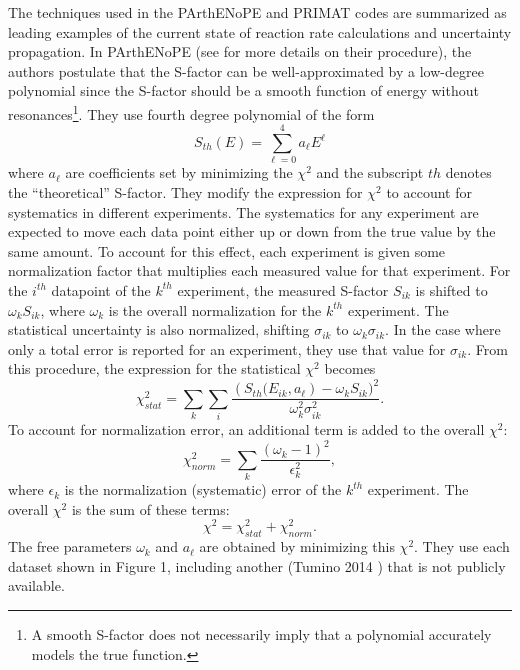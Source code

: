 \documentclass[%
 reprint,
superscriptaddress,
nofootinbib,
 amsmath,amssymb,
 aps,
 pra,
]{revtex4-2}
\begin{document}
The techniques used in the PArthENoPE and PRIMAT codes are summarized as leading examples of the current state of reaction rate calculations and uncertainty propagation. In PArthENoPE (see \cite{Pisanti2021} for more details on their procedure), the authors postulate that the S-factor can be well-approximated by a low-degree polynomial since the S-factor should be a smooth function of energy without resonances\footnote{A smooth S-factor does not necessarily imply that a polynomial accurately models the true function.}. They use fourth degree polynomial of the form 
\begin{equation}
	S_{th}(E) = \sum_{\ell=0}^4 a_\ell E^\ell \nonumber
\end{equation}
where $a_\ell$ are coefficients set by minimizing the $\chi^2$ and the subscript $th$ denotes the “theoretical” S-factor. They modify the expression for $\chi^2$ to account for systematics in different experiments. The systematics for any experiment are expected to move each data point either up or down from the true value by the same amount. To account for this effect, each experiment is given some normalization factor that multiplies each measured value for that experiment. For the $i^{th}$ datapoint of the $k^{th}$ experiment, the measured S-factor $S_{ik}$ is shifted to $\omega_k S_{ik}$, where $\omega_k$ is the overall normalization for the $k^{th}$ experiment. The statistical uncertainty is also normalized, shifting $\sigma_{ik}$ to $\omega_k \sigma_{ik}$. In the case where only a total error is reported for an experiment, they use that value for $\sigma_{ik}$. From this procedure, the expression for the statistical $\chi^2$ becomes 
\begin{equation}
	\chi^2_{stat} = \sum_k \sum_i \frac{\left(S_{th}(E_{ik}, a_\ell \right) - \omega_k S_{ik} )^2}{\omega_k^2 \sigma_{ik}^2}. \nonumber
\end{equation}
To account for normalization error, an additional term is added to the overall $\chi^2$:
\begin{equation}
	\chi^2_{norm} = \sum_k \frac{\left( \omega_k - 1 \right)^2}{\epsilon_k^2}, \nonumber
\end{equation}
where $\epsilon_k$ is the normalization (systematic) error of the $k^{th}$ experiment. The overall $\chi^2$ is the sum of these terms:
\begin{equation}
	\chi^2 = \chi^2_{stat} + \chi^2_{norm}. \nonumber
\end{equation}
The free parameters $\omega_k$ and $a_\ell$ are obtained by minimizing this $\chi^2$. They use each dataset shown in Figure 1, including another (Tumino 2014 \cite{Tumino2014}) that is not publicly available. 
\end{document}
